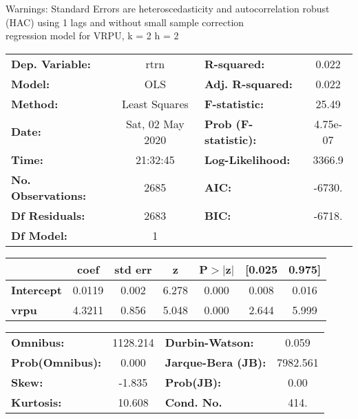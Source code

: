 Warnings: \newline
 [1] Standard Errors are heteroscedasticity and autocorrelation robust (HAC) using 1 lags and without small sample correction\\ 

regression model for VRPU, k = 2 h = 2\begin{center}
\begin{tabular}{lclc}
\toprule
\textbf{Dep. Variable:}    &       rtrn       & \textbf{  R-squared:         } &     0.022   \\
\textbf{Model:}            &       OLS        & \textbf{  Adj. R-squared:    } &     0.022   \\
\textbf{Method:}           &  Least Squares   & \textbf{  F-statistic:       } &     25.49   \\
\textbf{Date:}             & Sat, 02 May 2020 & \textbf{  Prob (F-statistic):} &  4.75e-07   \\
\textbf{Time:}             &     21:32:45     & \textbf{  Log-Likelihood:    } &    3366.9   \\
\textbf{No. Observations:} &        2685      & \textbf{  AIC:               } &    -6730.   \\
\textbf{Df Residuals:}     &        2683      & \textbf{  BIC:               } &    -6718.   \\
\textbf{Df Model:}         &           1      & \textbf{                     } &             \\
\bottomrule
\end{tabular}
\begin{tabular}{lcccccc}
                   & \textbf{coef} & \textbf{std err} & \textbf{z} & \textbf{P$> |$z$|$} & \textbf{[0.025} & \textbf{0.975]}  \\
\midrule
\textbf{Intercept} &       0.0119  &        0.002     &     6.278  &         0.000        &        0.008    &        0.016     \\
\textbf{vrpu}      &       4.3211  &        0.856     &     5.048  &         0.000        &        2.644    &        5.999     \\
\bottomrule
\end{tabular}
\begin{tabular}{lclc}
\textbf{Omnibus:}       & 1128.214 & \textbf{  Durbin-Watson:     } &    0.059  \\
\textbf{Prob(Omnibus):} &   0.000  & \textbf{  Jarque-Bera (JB):  } & 7982.561  \\
\textbf{Skew:}          &  -1.835  & \textbf{  Prob(JB):          } &     0.00  \\
\textbf{Kurtosis:}      &  10.608  & \textbf{  Cond. No.          } &     414.  \\
\bottomrule
\end{tabular}
\end{center}

